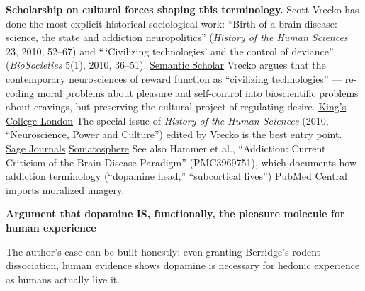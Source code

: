 \begin{itemize}
  \textbf{Scholarship on cultural forces shaping this terminology.} Scott Vrecko has done the most explicit historical-sociological work: ``Birth of a brain disease: science, the state and addiction neuropolitics'' (\emph{History of the Human Sciences} 23, 2010, 52--67) and ``\,`Civilizing technologies' and the control of deviance'' (\emph{BioSocieties} 5(1), 2010, 36--51). \href{https://www.semanticscholar.org/paper/\%E2\%80\%98Civilizing-technologies\%E2\%80\%99-and-the-control-of-Vrecko/658114856559331138582d44432532d544426fc2}{Semantic Scholar} Vrecko argues that the contemporary neurosciences of reward function as ``civilizing technologies'' --- re-coding moral problems about pleasure and self-control into bioscientific problems about cravings, but preserving the cultural project of regulating desire. \href{https://kclpure.kcl.ac.uk/portal/en/publications/civilizing-technologies-and-the-control-of-deviance(b0f2de9e-ab33-4053-8520-a838b6acbdf6).html}{King's College London} The special issue of \emph{History of the Human Sciences} (2010, ``Neuroscience, Power and Culture'') edited by Vrecko is the best entry point. \href{https://journals.sagepub.com/doi/10.1177/0952695109354395}{Sage Journals} \href{http://somatosphere.net/2010/neuroscience-power-and-culture-special.html/}{Somatosphere} See also Hammer et al., ``Addiction: Current Criticism of the Brain Disease Paradigm'' (PMC3969751), which documents how addiction terminology (``dopamine head,'' ``subcortical lives'') \href{https://pmc.ncbi.nlm.nih.gov/articles/PMC3969751/}{PubMed Central} imports moralized imagery.
\end{itemize}

\textbf{Argument that dopamine IS, functionally, the pleasure molecule for human experience}

The author's case can be built honestly: even granting Berridge's rodent dissociation, human evidence shows dopamine is necessary for hedonic experience as humans actually live it.

